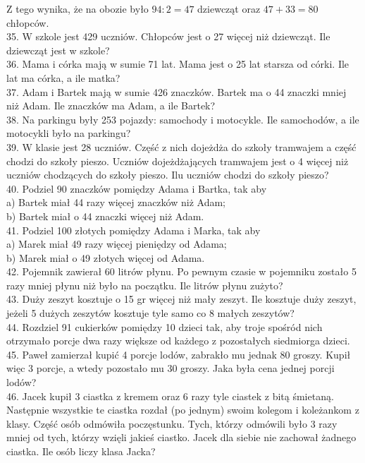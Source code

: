 \documentclass[10pt]{article}
\begin{document}
Z tego wynika, że na obozie było \(94: 2=47\) dziewcząt oraz \(47+33=80\) chłopców.\\
35. W szkole jest 429 uczniów. Chłopców jest o 27 więcej niż dziewcząt. Ile dziewcząt jest w szkole?\\
36. Mama i córka mają w sumie 71 lat. Mama jest o 25 lat starsza od córki. Ile lat ma córka, a ile matka?\\
37. Adam i Bartek mają w sumie 426 znaczków. Bartek ma o 44 znaczki mniej niż Adam. Ile znaczków ma Adam, a ile Bartek?\\
38. Na parkingu były 253 pojazdy: samochody i motocykle. Ile samochodów, a ile motocykli było na parkingu?\\
39. W klasie jest 28 uczniów. Część z nich dojeżdża do szkoły tramwajem a część chodzi do szkoły pieszo. Uczniów dojeżdżających tramwajem jest o 4 więcej niż uczniów chodzących do szkoły pieszo. Ilu uczniów chodzi do szkoły pieszo?\\
40. Podziel 90 znaczków pomiędzy Adama i Bartka, tak aby\\
a) Bartek miał 44 razy więcej znaczków niż Adam;\\
b) Bartek miał o 44 znaczki więcej niż Adam.\\
41. Podziel 100 złotych pomiędzy Adama i Marka, tak aby\\
a) Marek miał 49 razy więcej pieniędzy od Adama;\\
b) Marek miał o 49 złotych więcej od Adama.\\
42. Pojemnik zawierał 60 litrów płynu. Po pewnym czasie w pojemniku zostało 5 razy mniej płynu niż było na początku. Ile litrów płynu zużyto?\\
43. Duży zeszyt kosztuje o 15 gr więcej niż mały zeszyt. Ile kosztuje duży zeszyt, jeżeli 5 dużych zeszytów kosztuje tyle samo co 8 małych zeszytów?\\
44. Rozdziel 91 cukierków pomiędzy 10 dzieci tak, aby troje spośród nich otrzymało porcje dwa razy większe od każdego z pozostałych siedmiorga dzieci.\\
45. Paweł zamierzał kupić 4 porcje lodów, zabrakło mu jednak 80 groszy. Kupił więc 3 porcje, a wtedy pozostało mu 30 groszy. Jaka była cena jednej porcji lodów?\\
46. Jacek kupił 3 ciastka z kremem oraz 6 razy tyle ciastek z bitą śmietaną. Następnie wszystkie te ciastka rozdał (po jednym) swoim kolegom i koleżankom z klasy. Część osób odmówiła poczęstunku. Tych, którzy odmówili było 3 razy mniej od tych, którzy wzięli jakieś ciastko. Jacek dla siebie nie zachował żadnego ciastka. Ile osób liczy klasa Jacka?\\
\end{document}

